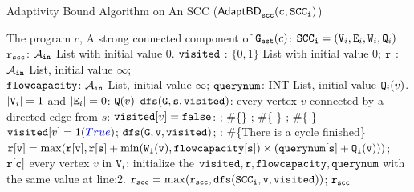 {\footnotesize
\begin{algorithm}
            \caption{
            {\small Adaptivity Bound Algorithm on An SCC ({$\mathtt{\mathsf{AdaptBD}_{scc}(c, SCC_i)}$})}
            \label{alg:adaptscc}
            }
            \begin{algorithmic}[1]
              \REQUIRE The program $c$, 
              A strong connected component of $\mathtt{{G_{est}}}(c)$: $ \mathtt{SCC_i} = (\mathtt{V}_i, \mathtt{E}_i, \mathtt{W}_i, \mathtt{Q}_i)$
            $\mathtt{r_{scc}}$: $\mathcal{A}_{\mathtt{in}}$ List with initial value $0$.
            $\mathtt{visited}$ : $\{0, 1\}$ List with initial value $0$;
            $\mathtt{r}$ : $\mathcal{A}_{\mathtt{in}}$ List, initial value $\infty$;
            \\ \qquad  
            $\mathtt{flowcapacity}$: $\mathcal{A}_{\mathtt{in}}$ List, initial value $\infty$;
            $\mathtt{querynum}$: INT List, initial value $\mathtt{Q}_i(v)$.
             $|\mathtt{V}_i| = 1$ and $|\mathtt{E}_i| = 0$:
              $\mathtt{Q}(v)$
             {$\mathtt{dfs(G,s,visited)}$}:
            \STATE {} every vertex $v$ 
            connected by a directed edge from $s$:
            \STATE \qquad {} $\mathtt{visited}[v] = \mathtt{false}$:
            \STATE \qquad \qquad {}; \qquad \qquad \#\{\}
            \STATE \qquad \qquad {}; \qquad \qquad \qquad \qquad\#\{ \}
            \STATE \qquad \qquad {}; \#\{ \}
            \STATE \qquad \qquad \qquad  $\kw{visited}[v] = 1(\highlight{True})$; %
            \quad $\mathtt{dfs(G, v, visited)}$;
            \STATE \qquad {}: \#\{There is a cycle finished\}
            \STATE \qquad \qquad \qquad 
            {\small{$\mathtt{r[v] =  \max(r[v], r[s] +\min(\mathtt{W}_i(v), {flowcapacity}[s]) \times (querynum[s] + \mathtt{Q}_i(v)))}$}};
            \STATE {}  $\mathtt{r[c]}$
             every vertex $v$ in $\mathtt{V}_i$:
            \STATE  \qquad initialize the $\mathtt{visited, r, flowcapacity, querynum}$ with the same value at line:2.
            \STATE  \qquad $\mathtt{r_{scc} = \max(r_{scc}, dfs(SCC_i, v, \mathtt{visited} ))}$;
            \RETURN  $\mathtt{r_{scc}}$
            \end{algorithmic}
            \end{algorithm}
}           

